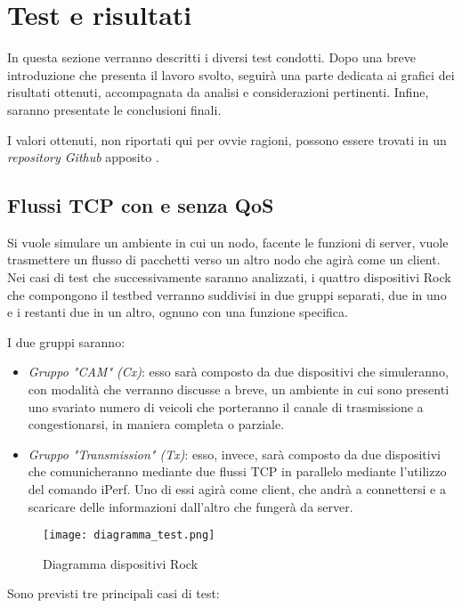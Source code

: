\chapter{Test e risultati}

In questa sezione verranno descritti i diversi test condotti. Dopo una breve introduzione che presenta il lavoro svolto, seguirà una parte dedicata ai grafici dei risultati ottenuti, accompagnata da analisi e considerazioni pertinenti. Infine, saranno presentate le conclusioni finali.

I valori ottenuti, non riportati qui per ovvie ragioni, possono essere trovati in un \textit{repository Github} apposito \cite{ACPlot}.

\section{Flussi TCP con e senza QoS}
Si vuole simulare un ambiente in cui un nodo, facente le funzioni di server, vuole trasmettere un flusso di pacchetti verso un altro nodo che agirà come un client. 
Nei casi di test che successivamente saranno analizzati, i quattro dispositivi Rock che compongono il testbed verranno suddivisi in due gruppi separati, due in uno e i restanti due in un altro, ognuno con una funzione specifica.

I due gruppi saranno:
\begin{itemize}
    \item \textit{Gruppo "CAM" (Cx)}: esso sarà composto da due dispositivi che simuleranno, con modalità che verranno discusse a breve, un ambiente in cui sono presenti uno svariato numero di veicoli che porteranno il canale di trasmissione a congestionarsi, in maniera completa o parziale.
    \item \textit{Gruppo "Transmission" (Tx)}: esso, invece, sarà composto da due dispositivi che comunicheranno mediante due flussi TCP in parallelo mediante l'utilizzo del comando iPerf. Uno di essi agirà come client, che andrà a connettersi e a scaricare delle informazioni dall'altro che fungerà da server.
\end{itemize}

\begin{figure}[h!]
    \centering
    \texttt{[image: diagramma\_test.png]}
    \caption{Diagramma dispositivi Rock}
    \label{fig:diagramma}
\end{figure}

Sono previsti tre principali casi di test:

